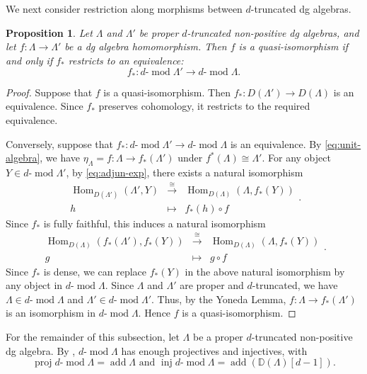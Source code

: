 \documentclass[11pt,a4paper,reqno]{amsart}
\theoremstyle{plain}
\newtheorem{proposition}[theorem]{Proposition}
\numberwithin{equation}{section}
\theoremstyle{definition}
\providecommand{\add}{\operatorname{add}}
\renewcommand{\mod}{\operatorname{mod}}
\newcommand{\Hom}{\operatorname{Hom}}
\newcommand{\Proj}{\operatorname{proj}}
\newcommand{\Inj}{\operatorname{inj}}
\newcommand{\emod}[2]{#1\text{-}\!\mod #2}
\begin{document}
We next consider restriction along morphisms between $d$-truncated dg algebras.

\begin{proposition}\label{prop:trun}
Let $\Lambda$ and $\Lambda'$ be proper $d$-truncated non-positive dg algebras, and let $f\colon\Lambda\to\Lambda'$ be a dg algebra homomorphism. Then $f$ is a quasi-isomorphism if and only if $f_*$ restricts to an equivalence:
\[f_*\colon\emod{d}{\Lambda'}\to\emod{d}{\Lambda}.\]
\end{proposition}

\begin{proof}
Suppose that $f$ is a quasi-isomorphism. Then $f_*\colon D(\Lambda')\to D(\Lambda)$ is an equivalence. Since $f_*$ preserves cohomology, it restricts to the required equivalence.

Conversely, suppose that $f_*\colon\emod{d}{\Lambda'}\to\emod{d}{\Lambda}$ is an equivalence. By \eqref{eq:unit-algebra}, we have $\eta_\Lambda=f\colon\Lambda\to f_*(\Lambda')$ under $f^*(\Lambda)\cong\Lambda'$. For any object $Y\in\emod{d}{\Lambda'}$, by \eqref{eq:adjun-exp}, there exists a natural isomorphism
\[
  \begin{array}{ccc}
    \Hom_{D(\Lambda')}(\Lambda',Y) & \xrightarrow{\cong} & \Hom_{D(\Lambda)}(\Lambda,f_*(Y))\\
    h & \mapsto & f_*(h)\circ f
  \end{array}.
\]
Since $f_*$ is fully faithful, this induces a natural isomorphism
\[
  \begin{array}{ccc}
    \Hom_{D(\Lambda)}(f_*(\Lambda'),f_*(Y)) & \xrightarrow{\cong} & \Hom_{D(\Lambda)}(\Lambda,f_*(Y))\\
    g & \mapsto & g\circ f
  \end{array}.
\]
Since $f_*$ is dense, we can replace $f_*(Y)$ in the above natural isomorphism by any object in $\emod{d}{\Lambda}$. Since $\Lambda$ and $\Lambda'$ are proper and $d$-truncated, we have $\Lambda\in\emod{d}{\Lambda}$ and $\Lambda'\in\emod{d}{\Lambda'}$. Thus, by the Yoneda Lemma, $f\colon\Lambda\to f_*(\Lambda')$ is an isomorphism in $\emod{d}{\Lambda}$. Hence $f$ is a quasi-isomorphism.
\end{proof}


For the remainder of this subsection, let $\Lambda$ be a proper $d$-truncated non-positive dg algebra. By \cite[Corollary~2.3]{MP}, $\emod{d}{\Lambda}$ has enough projectives and injectives, with
\begin{equation}\label{eq:extend-proj-inj}
 \Proj\emod{d}{\Lambda}=\add \Lambda \text{ and } \Inj\emod{d}{\Lambda}=\add\left(\mathbb D(\Lambda)[d-1]\right).
\end{equation}
\end{document}
